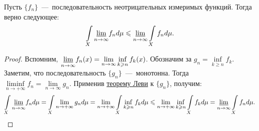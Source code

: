 \begin{theorem}[Фату]
    Пусть $\{f_n\}$~---~последовательность неотрицательных измеримых функций. Тогда верно следующее: \[\int\limits_X   \underset{n \rightarrow \infty}{\underline{\lim}} f_nd\mu \leqslant \underset{n \rightarrow \infty}{\underline{\lim}} \int\limits_{X} f_nd\mu.\]
\end{theorem}
\begin{proof}
    Вспомним, $\underset{n \rightarrow \infty}{\underline{\lim}} f_n(x) = \lim\limits_{n \rightarrow \infty} \inf\limits_{k\geqslant n} f_k(x)$. Обозначим за $g_n = \inf\limits_{k \geq n} f_k$. Заметим, что последовательность $\{ g_n\}$~---~монотонна. Тогда $\liminf\limits_{n \rightarrow +\infty} f_n = \lim\limits_{n \rightarrow \infty} g_n$. Применив \hyperlink{beppo_levi}{теорему Леви} к $\{ g_n\}$, получим: \[\int\limits_X \underset{n \rightarrow \infty}{\underline{\lim}} f_n d\mu =  \int\limits_X \lim\limits_{n \rightarrow +\infty} g_nd\mu = \lim\limits_{n\rightarrow +\infty} \int\limits_X \inf\limits_{k \geqslant n} f_k d\mu \leqslant \lim\limits_{n\rightarrow +\infty}\inf\limits_{k \geqslant n} \int\limits_X f_k d\mu = \underset{n \rightarrow \infty}{\underline{\lim}} \int\limits_X f_nd\mu.\]
\end{proof}

